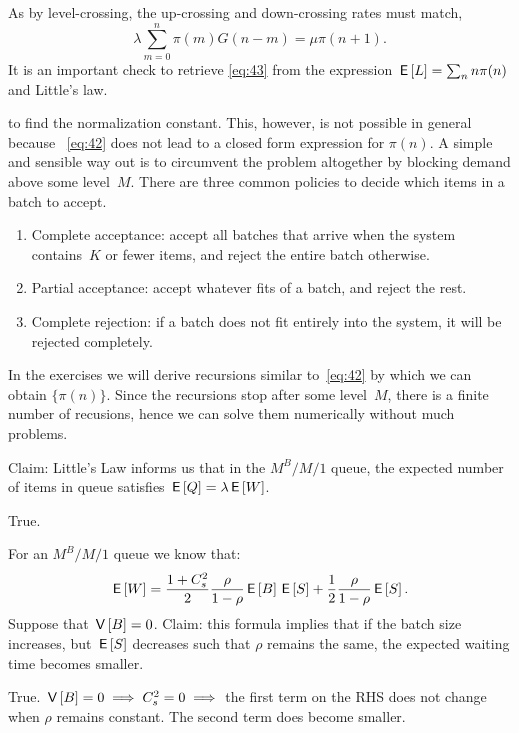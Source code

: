 \documentclass[stochastic-or.tex]{subfiles}
\begin{document}
As by level-crossing, the up-crossing and down-crossing rates must match,
\begin{equation}\label{eq:42}
\lambda \sum_{m=0}^n \pi(m) G(n-m) = \mu \pi(n+1).
\end{equation}
It is an important check to retrieve \cref{eq:43} from the expression $\,\mathsf{E}\left[L\right] = \sum_{n} n \pi(n)$ and Little's law.

 to find the normalization constant.
This, however, is not possible in general because ~\cref{eq:42} does not lead to a closed form expression for $\pi(n)$.
A simple and sensible way out is to circumvent the problem altogether by blocking demand above some level~$M$.
There are three common policies to decide which items in a batch to accept.
\begin{enumerate}
\item Complete acceptance: accept all batches that arrive when the system contains~$K$ or fewer items, and reject the entire batch otherwise.
\item Partial acceptance: accept whatever fits of a batch, and reject the rest.
\item Complete rejection: if a batch does not fit entirely into the system, it will be rejected completely.
\end{enumerate}
In the exercises we will derive recursions similar to~\cref{eq:42} by which we can obtain $\{\pi(n)\}$.
Since the recursions stop after some level~$M$, there is a finite number of recusions, hence we can solve them numerically without much problems.


\begin{truefalse}
Claim:   Little's Law informs us that in the $M^{B}/M/1$ queue, the expected number of items in queue satisfies $\,\mathsf{E}\left[Q\right]=\lambda\,\mathsf{E}\left[W\right]$.
    \begin{solution}
        True.
    \end{solution}
\end{truefalse}

\begin{truefalse}
    For an $M^B/M/1$ queue we know that:
    $$
    \,\mathsf{E}\left[W\right]=\frac{1+C_s^2}{2}\frac{\rho}{1-\rho}\,\mathsf{E}\left[B\right]\,\mathsf{E}\left[S\right]+\frac{1}{2}\frac{\rho}{1-\rho}\,\mathsf{E}\left[S\right].
    $$
    Suppose that $\,\mathsf{V}\left[B\right] = 0$.
    Claim: this formula implies that if the batch size increases, but $\,\mathsf{E}\left[S\right]$ decreases such that $\rho$ remains the same, the expected waiting time becomes smaller.

    \begin{solution}
        True. $\,\mathsf{V}\left[B\right] = 0 \implies C_{s}^{2} = 0 \implies$ the first term on the RHS does not change when $\rho$ remains constant. The second term does become smaller.
    \end{solution}
\end{truefalse}
\end{document}
